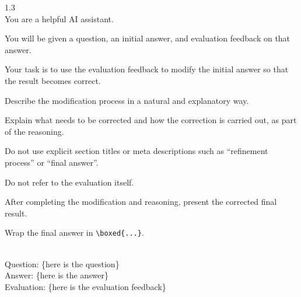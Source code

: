 \clearpage
\begin{tcolorbox}
[title=Teacher Prompt for Generating Correction Answer, colback=white, colframe=black!75!white, breakable]
\begin{spacing}{1.3}
\label{prompt:refinement}
\textbf{\color{blue}{/* System Prompt */}}\\
You are a helpful AI assistant.

You will be given a question, an initial answer, and evaluation feedback on that answer. 

Your task is to use the evaluation feedback to modify the initial answer so that the result becomes correct.

Describe the modification process in a natural and explanatory way.  

Explain what needs to be corrected and how the correction is carried out, as part of the reasoning.

Do not use explicit section titles or meta descriptions such as ``refinement process'' or ``final answer''. 

Do not refer to the evaluation itself.

After completing the modification and reasoning, present the corrected final result.

Wrap the final answer in \verb|\boxed{...}|.

\textbf{\color{blue}{/* User Prompt */}}\\
Question: \{here is the question\}\\
Answer: \{here is the answer\} \\
Evaluation: \{here is the evaluation feedback\}
\end{spacing}
\end{tcolorbox}